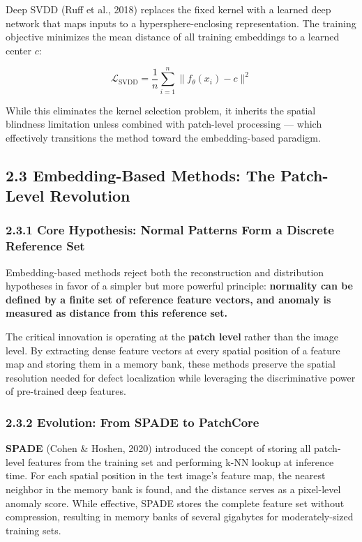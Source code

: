 \documentclass[12pt, a4paper, oneside]{report}
\begin{document}
Deep SVDD (Ruff et al., 2018) replaces the fixed kernel with a learned deep network that maps inputs to a hypersphere-enclosing representation. The training objective minimizes the mean distance of all training embeddings to a learned center \(c\):

\[\mathcal{L}_{\text{SVDD}} = \frac{1}{n} \sum_{i=1}^{n} \| f_\theta(x_i) - c \|^2\]

While this eliminates the kernel selection problem, it inherits the spatial blindness limitation unless combined with patch-level processing --- which effectively transitions the method toward the embedding-based paradigm.

\bigskip\noindent\hrulefill\bigskip

\subsection{2.3 Embedding-Based Methods: The Patch-Level Revolution}\label{embedding-based-methods-the-patch-level-revolution}

\subsubsection{2.3.1 Core Hypothesis: Normal Patterns Form a Discrete Reference Set}\label{core-hypothesis-normal-patterns-form-a-discrete-reference-set}

Embedding-based methods reject both the reconstruction and distribution hypotheses in favor of a simpler but more powerful principle: \textbf{normality can be defined by a finite set of reference feature vectors, and anomaly is measured as distance from this reference set.}

The critical innovation is operating at the \textbf{patch level} rather than the image level. By extracting dense feature vectors at every spatial position of a feature map and storing them in a memory bank, these methods preserve the spatial resolution needed for defect localization while leveraging the discriminative power of pre-trained deep features.

\subsubsection{2.3.2 Evolution: From SPADE to PatchCore}\label{evolution-from-spade-to-patchcore}

\textbf{SPADE} (Cohen \& Hoshen, 2020) introduced the concept of storing all patch-level features from the training set and performing k-NN lookup at inference time. For each spatial position in the test image's feature map, the nearest neighbor in the memory bank is found, and the distance serves as a pixel-level anomaly score. While effective, SPADE stores the complete feature set without compression, resulting in memory banks of several gigabytes for moderately-sized training sets.
\end{document}
